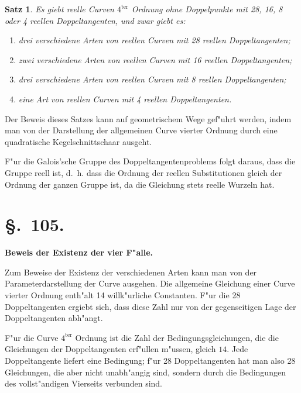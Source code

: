 \documentclass[12pt,a4paper]{article}
\theoremstyle{plain}
\newtheorem{satz}{Satz}[section]
\begin{document}
\begin{satz}
Es giebt reelle Curven $4^{\text{ter}}$ Ordnung ohne Doppelpunkte mit 28, 16, 8 oder 4 reellen Doppeltangenten, und zwar giebt es:
\begin{enumerate}[label=\alph*)]
\item drei verschiedene Arten von reellen Curven mit 28 reellen Doppeltangenten;
\item zwei verschiedene Arten von reellen Curven mit 16 reellen Doppeltangenten;
\item drei verschiedene Arten von reellen Curven mit 8 reellen Doppeltangenten;
\item eine Art von reellen Curven mit 4 reellen Doppeltangenten.
\end{enumerate}
\end{satz}

Der Beweis dieses Satzes kann auf geometrischem Wege gef"uhrt werden, indem man von der Darstellung der allgemeinen Curve vierter Ordnung durch eine quadratische Kegelschnittschaar ausgeht.

F"ur die Galois'sche Gruppe des Doppeltangentenproblems folgt daraus, dass die Gruppe reell ist, d.~h. dass die Ordnung der reellen Substitutionen gleich der Ordnung der ganzen Gruppe ist, da die Gleichung stets reelle Wurzeln hat.

\section*{\S.~105.}
\begin{center}
\large\bfseries Beweis der Existenz der vier F"alle.
\end{center}
\vspace{0.5em}

Zum Beweise der Existenz der verschiedenen Arten kann man von der Parameterdarstellung der Curve ausgehen. Die allgemeine Gleichung einer Curve vierter Ordnung enth"alt 14 willk"urliche Constanten. F"ur die 28 Doppeltangenten ergiebt sich, dass diese Zahl nur von der gegenseitigen Lage der Doppeltangenten abh"angt.

F"ur die Curve $4^{\text{ter}}$ Ordnung ist die Zahl der Bedingungsgleichungen, die die Gleichungen der Doppeltangenten erf"ullen m"ussen, gleich $14$. Jede Doppeltangente liefert eine Bedingung; f"ur 28 Doppeltangenten hat man also 28 Gleichungen, die aber nicht unabh"angig sind, sondern durch die Bedingungen des vollst"andigen Vierseits verbunden sind.
\end{document}
